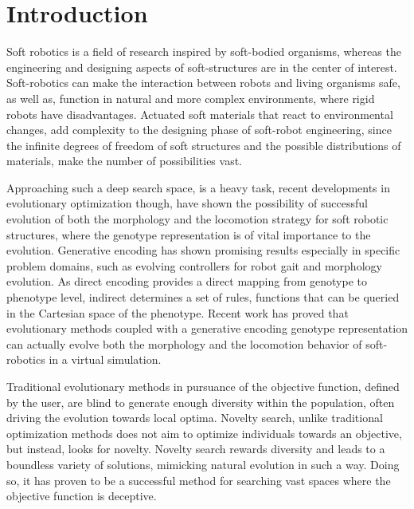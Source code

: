 
\chapter{Introduction} %

\label{Chapter1} %


Soft robotics is a field of research inspired by soft-bodied organisms, whereas the engineering and designing aspects of soft-structures are in the center of interest. Soft-robotics can make the interaction between robots and living organisms safe, as well as, function in natural and more complex environments, where rigid robots have disadvantages. Actuated soft materials that react to environmental changes, add complexity to the designing phase of soft-robot engineering, since the infinite degrees of freedom of soft structures and the possible distributions of materials, make the number of possibilities vast.

Approaching such a deep search space, is a heavy task, recent developments in evolutionary optimization though, have shown the possibility of successful evolution of both the morphology and the locomotion strategy for soft robotic structures, where the genotype representation is of vital importance to the evolution. Generative encoding has shown promising results especially in specific problem domains, such as evolving controllers for robot gait and morphology evolution. As direct encoding provides a direct mapping from genotype to phenotype level, indirect determines a set of rules, functions that can be queried in the Cartesian space of the phenotype. Recent work has proved that evolutionary methods coupled with a generative encoding genotype representation can actually evolve both the morphology and the locomotion behavior of soft-robotics in a virtual simulation.

Traditional evolutionary methods in pursuance of the objective function, defined by the user, are blind to generate enough diversity within the population, often driving the evolution towards local optima. Novelty search, unlike traditional optimization methods does not aim to optimize individuals towards an objective, but instead, looks for novelty. Novelty search rewards diversity and leads to a boundless variety of solutions, mimicking natural evolution in such a way. Doing so, it has proven to be a successful method for searching vast spaces where the objective function is deceptive.

